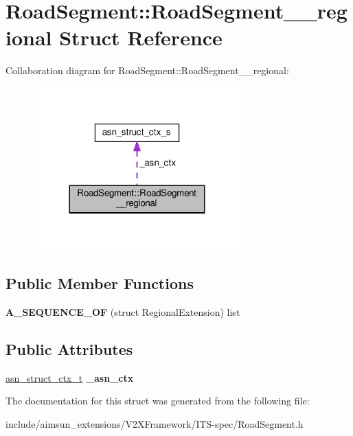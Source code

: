 \hypertarget{structRoadSegment_1_1RoadSegment____regional}{}\section{Road\+Segment\+:\+:Road\+Segment\+\_\+\+\_\+regional Struct Reference}
\label{structRoadSegment_1_1RoadSegment____regional}


Collaboration diagram for Road\+Segment\+:\+:Road\+Segment\+\_\+\+\_\+regional\+:\nopagebreak
\begin{figure}[H]
\begin{center}
\leavevmode
\includegraphics[width=227pt]{structRoadSegment_1_1RoadSegment____regional__coll__graph}
\end{center}
\end{figure}
\subsection*{Public Member Functions}
\begin{DoxyCompactItemize}
\item 
{\bfseries A\+\_\+\+S\+E\+Q\+U\+E\+N\+C\+E\+\_\+\+OF} (struct Regional\+Extension) list\hypertarget{structRoadSegment_1_1RoadSegment____regional_a2079a23ef22d4ad02e4d71ca6aff2b6c}{}\label{structRoadSegment_1_1RoadSegment____regional_a2079a23ef22d4ad02e4d71ca6aff2b6c}

\end{DoxyCompactItemize}
\subsection*{Public Attributes}
\begin{DoxyCompactItemize}
\item 
\hyperlink{structasn__struct__ctx__s}{asn\+\_\+struct\+\_\+ctx\+\_\+t} {\bfseries \+\_\+asn\+\_\+ctx}\hypertarget{structRoadSegment_1_1RoadSegment____regional_adc18ca1926a869268468a64a5e7db0b0}{}\label{structRoadSegment_1_1RoadSegment____regional_adc18ca1926a869268468a64a5e7db0b0}

\end{DoxyCompactItemize}


The documentation for this struct was generated from the following file\+:\begin{DoxyCompactItemize}
\item 
include/aimsun\+\_\+extensions/\+V2\+X\+Framework/\+I\+T\+S-\/spec/Road\+Segment.\+h\end{DoxyCompactItemize}
